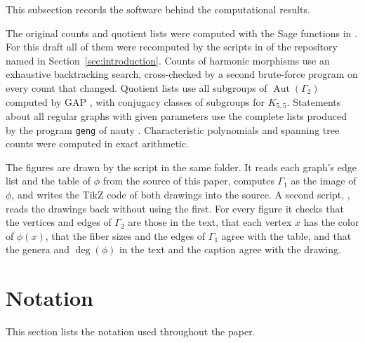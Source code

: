 \documentclass[12pt,letterpaper]{article}
\theoremstyle{definition}
\DeclareMathOperator{\Aut}{Aut}
\begin{document}
This subsection records the software behind the computational results.

The original counts and quotient lists were computed with the Sage
functions in  \cite{Sage}. For this draft all of
them were recomputed by the scripts in 
of the repository named in Section~\ref{sec:introduction}. Counts of
harmonic morphisms use an exhaustive backtracking search, cross-checked by a
second brute-force program on every count that changed. Quotient lists use
all subgroups of $\Aut(\Gamma_2)$ computed by GAP \cite{GAP}, with
conjugacy classes of subgroups for $K_{5,5}$. Statements about all regular
graphs with given parameters use the complete lists produced by the
program {\tt geng} of nauty \cite{MP14}. Characteristic polynomials and
spanning tree counts were computed in exact arithmetic.

The figures are drawn by the script  in the same
folder. It reads each graph's edge list and the table of $\phi$ from the
source of this paper, computes $\Gamma_1$ as the image of $\phi$, and
writes the TikZ code of both drawings into the source. A second script,
, reads the drawings back without using the first.
For every figure it checks that the vertices and edges of $\Gamma_2$ are
those in the text, that each vertex $x$ has the color of $\phi(x)$, that
the fiber sizes and the edges of $\Gamma_1$ agree with the table, and that
the genera and $\deg(\phi)$ in the text and the caption agree with the
drawing.

\section{Notation}
\label{sec:notation}

This section lists the notation used throughout the paper.
\end{document}
